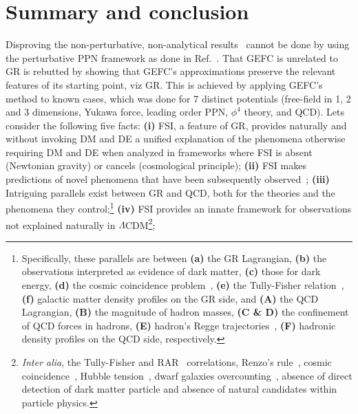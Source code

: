 \documentclass[superscriptaddress,amsmath,amssymb,nofootinbib]{revtex4}
\begin{document}
\section{Summary and conclusion} 
%
Disproving the non-perturbative, non-analytical results~\cite{Deur:2009ya, Deur:2016bwq, Deur:2017aas, Deur:2020wlg} cannot be done by using the perturbative 
PPN framework as done in Ref.~\cite{Barker:2023xsx}.
%
That GEFC is unrelated to GR is rebutted by showing that GEFC's approximations preserve the relevant features of its starting point, viz GR. 
This is achieved by applying GEFC's method to known cases, which was done for 
7 distinct potentials (free-field in 1, 2 and 3 dimensions, Yukawa force, leading order PPN, $\phi^4$ theory, and QCD).  
%
Lets consider the following five facts:
\textbf{(i)} FSI, a feature of GR, provides naturally and without invoking DM and DE a unified explanation of the phenomena otherwise requiring DM and DE 
when analyzed in frameworks where FSI is absent (Newtonian gravity) or cancels (cosmological principle);
\textbf{(ii)} FSI makes predictions of novel phenomena that have been subsequently observed~\cite{Deur:2013baa, Winters:2022ruw};
\textbf{(iii)}  Intriguing parallels exist between GR and QCD, both for the theories and the phenomena they control;\footnote{
Specifically, these parallels are between  
\textbf{(a)} the GR Lagrangian,
\textbf{(b)} the observations interpreted as evidence of  dark matter, 
\textbf{(c)} those for dark energy, 
\textbf{(d)} the cosmic coincidence problem~\cite{cosmic_coinc_pb}, 
\textbf{(e)} the Tully-Fisher relation~\cite{Tully:1977fu}, 
\textbf{(f)} galactic matter density profiles on the GR side, and
\textbf{(A)} the QCD Lagrangian,
\textbf{(B)} the magnitude of hadron masses, 
\textbf{(C \& D)} the confinement of QCD forces in hadrons, 
\textbf{(E)} hadron's Regge trajectories~\cite{the:Regge}, \textbf{(F)} hadronic density profiles on the QCD side, respectively. 
}
\textbf{(iv)} FSI provides an innate framework for observations not explained naturally in $\Lambda$CDM\footnote{ 
{\it Inter alia}, the Tully-Fisher and RAR~\cite{McGaugh:2016leg} correlations, Renzo's rule~\cite{Sancisi:2003xt}, cosmic coincidence~\cite{cosmic_coinc_pb}, Hubble tension~\cite{Abdalla:2022yfr}, dwarf galaxies overcounting~\citep{Klypin:1999uc}, absence of direct detection of dark matter particle and absence of natural candidates within particle physics.};
\end{document}
